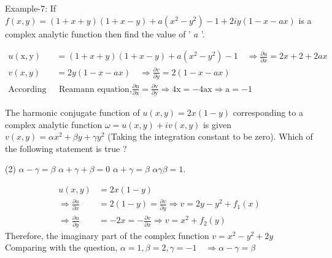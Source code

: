 	\begin{exercise}
		Example-7: If $f(x, y)=(1+x+y)(1+x-y)+a\left(x^{2}-y^{2}\right)-1+2 i y(1-x-a x)$ is a complex analytic function then find the value of ' $a$ '.
	\end{exercise}
	\begin{answer}
		\begin{align*}
		u(\mathrm{x}, \mathrm{y})&=(1+x+y)(1+x-y)+a\left(x^{2}-y^{2}\right)-1 \quad \Rightarrow \frac{\partial u}{\partial x}=2 x+2+2 a x \\
		v(x, y)&=2 y(1-x-a x) \quad \Rightarrow \frac{\partial v}{\partial y}=2(1-x-a x)\\
		\text{According to Cauchy  }&\text{ Reamann equation,}\frac{\partial \mathrm{u}}{\partial \mathrm{x}}=\frac{\partial \mathrm{v}}{\partial \mathrm{y}} \Rightarrow 4 \mathrm{x}=-4 \mathrm{ax} \Rightarrow \mathrm{a}=-1
		\end{align*}
	\end{answer}
	\begin{exercise}
		The harmonic conjugate function of $u(x, y)=2 x(1-y)$ corresponding to a complex analytic function $\omega=u(x, y)+i v(x, y)$ is given $v(x, y)=\alpha x^{2}+\beta y+\gamma y^{2}$ (Taking the integration constant to be zero).
		Which of the following statement is true ?
		 \begin{tasks}(2)
			\task[\textbf{a.}]$\alpha-\gamma=\beta$
			\task[\textbf{b.}]$\alpha+\gamma+\beta=0$
			\task[\textbf{c.}]$\alpha+\gamma=\beta$
			\task[\textbf{d.}] $\alpha \gamma \beta=1$.
		\end{tasks}
	\end{exercise}
	\begin{answer}
		\begin{align*}
		u(x, y)&=2 x(1-y) \\
		\Rightarrow \frac{\partial u}{\partial x}&=2(1-y)=\frac{\partial v}{\partial y} \Rightarrow v=2 y-y^{2}+f_{1}(x) \\
		\Rightarrow \frac{\partial u}{\partial y}&=-2 x=-\frac{\partial v}{\partial x} \Rightarrow v=x^{2}+f_{2}(y)
		\end{align*}
			Therefore, the imaginary part of the complex function $v=x^{2}-y^{2}+2 y$ \\Comparing with the question, $\alpha=1, \beta=2, \gamma=-1 \quad \Rightarrow \alpha-\gamma=\beta$
	\end{answer}
\
